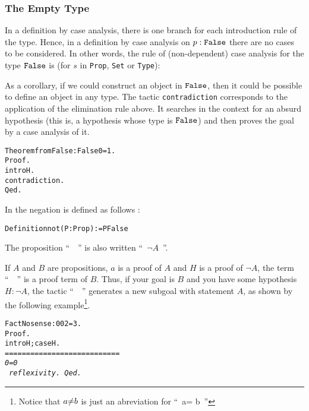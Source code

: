 \documentclass[11pt]{article}
\newcommand{\refmancite}[1]{{}}
\begin{document}
\subsubsection{The Empty Type}

In a definition by case analysis, there is one branch for each
introduction rule of the type. Hence, in a definition by case analysis
on $p:\texttt{False}$ there are no cases to be considered. In other words, the
rule of (non-dependent) case analysis for the type $\texttt{False}$ is
(for $s$ in  \texttt{Prop}, \texttt{Set} or \texttt{Type}):

\begin{center}
         {}
\end{center}

As a corollary, if we could construct an object in $\texttt{False}$, then it
could be possible to define an object in any type.  The tactic
\texttt{contradiction} \refmancite{Section \ref{Contradiction}}
corresponds to the application of the elimination rule above.  It
searches in the context for an absurd hypothesis (this is, a
hypothesis whose type is $\texttt{False}$) and then proves the goal by a case
analysis of it.

\begin{alltt}
Theorem fromFalse : False \arrow{} 0=1.
Proof.
 intro H.
 contradiction.
Qed.
\end{alltt}


In {\coq} the negation is defined as follows :

\begin{alltt}
Definition not (P:Prop) := P {\arrow} False
\end{alltt}

The proposition ``~~'' is also written ``~$\neg A$~''.

If $A$ and $B$ are propositions, $a$ is a proof of $A$ and
$H$ is a proof of $\neg A$,
the term ``~~'' is a proof term of
$B$.
Thus, if your goal is $B$ and you have some hypothesis $H:\neg A$,
the tactic ``~~'' generates a new subgoal with
statement $A$, as shown by  the following example\footnote{Notice that
$a\mbox{$\neq$} b$ is just an abreviation for ``~\coqnot a= b~''}.

\begin{alltt}
Fact Nosense : 0 {\coqdiff} 0 {\arrow} 2 = 3.
Proof.
  intro H; case H.
\it
===========================
  0 = 0
\tt
  reflexivity.
Qed.
\end{alltt}
\end{document}
